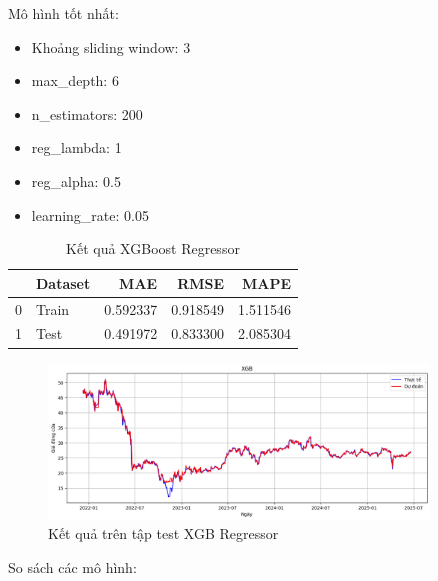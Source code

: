 \begin{itemize}
            Mô hình tốt nhất:
            \begin{itemize}
                \item Khoảng sliding window: 3
                \item max\_depth: 6
                \item n\_estimators: 200
                \item reg\_lambda: 1
                \item reg\_alpha: 0.5
                \item learning\_rate: 0.05
            \end{itemize}

            \begin{table}[htbp]
                \centering
                \caption{Kết quả XGBoost Regressor}
                \label{tab:stock-close-xgb}
                \begin{tabular}{llrrr}
                \hline
                 & Dataset & MAE & RMSE & MAPE \\
                \hline
                0 & Train & 0.592337 & 0.918549 & 1.511546 \\
                1 & Test & 0.491972 & 0.833300 & 2.085304 \\
                \hline
                \end{tabular}
            \end{table}

            \FloatBarrier

            \begin{figure}[htp]
                \centering
                \includegraphics[width=0.90\textwidth]{images/TS_stock_pred_cmp_XGB.png}
                \caption{Kết quả trên tập test XGB Regressor}
                \label{fig:TS_stock_pred_cmp_XGB}
            \end{figure}
            \FloatBarrier
    \end{itemize}

    So sách các mô hình:

